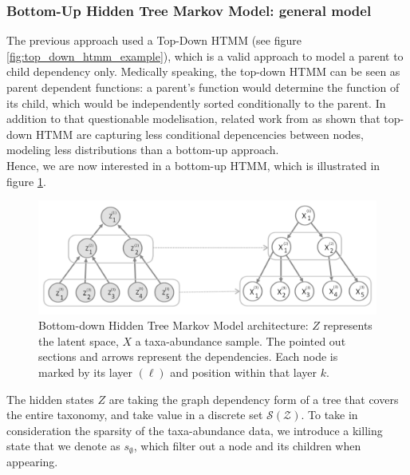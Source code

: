 \subsubsection{Bottom-Up Hidden Tree Markov Model: general model}

The previous approach used a Top-Down HTMM (see figure \ref{fig:top_down_htmm_example}), which is a valid approach to model a parent to child dependency only.
Medically speaking, the top-down HTMM can be seen as parent dependent functions: a parent's function would determine the function of its child, which would be independently sorted conditionally to the parent.
In addition to that questionable modelisation, related work from \cite{bottom_up_superiority_hidden_tree_markov_models} as shown that top-down HTMM are capturing
less conditional depencencies between nodes, modeling less distributions than a bottom-up approach. \\

Hence, we are now interested in a bottom-up HTMM, which is illustrated in figure \ref{fig:bottom_up_htmm_example}.

\begin{figure}[H]
    \centering
    \includegraphics[scale=.4]{images/bottom_up_hidden_markov_tree_example}
    \caption{Bottom-down Hidden Tree Markov Model architecture: $Z$ represents the latent space, $X$ a taxa-abundance sample.
    The pointed out sections and arrows represent the dependencies.
    Each node is marked by its layer $(\ell)$ and position within that layer $k$.}
    \label{fig:bottom_up_htmm_example}
\end{figure}

\newcommand{\killingstate}{s_{\emptyset}}

The hidden states $Z$ are taking the graph dependency form of a tree that covers the entire taxonomy, and take value in a discrete set $\mathcal{S(Z)}$.
To take in consideration the sparsity of the taxa-abundance data, we introduce a killing state that we denote as $\killingstate$, which filter out a node and its children when appearing. \\

